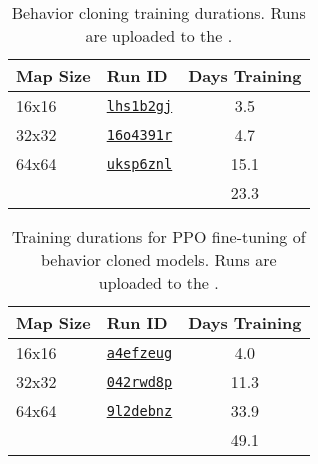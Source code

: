 \documentclass[conference]{IEEEtran}
\newcounter{supptable}
\newenvironment{supptable}
  {\renewcommand{\tablename}{Supplemental Table}\setcounter{table}{\value{supptable}}\addtocounter{supptable}{1}\begin{table}}
  {\end{table}\setcounter{supptable}{\value{table}}}
\begin{document}
\begin{supptable}[H]
    \caption{Behavior cloning training durations. Runs are uploaded to the \microRTSWBProject.}
    \label{tab:bc-training-durations}
    \begin{center}
    \begin{tabular}{llc}
        Map Size & Run ID & Days Training \\
        \midrule
        16x16 & \href{https://wandb.ai/\microRTSWBProjectPath/runs/lhs1b2gj}{\texttt{lhs1b2gj}} & 3.5 \\
        32x32 & \href{https://wandb.ai/\microRTSWBProjectPath/runs/16o4391r}{\texttt{16o4391r}} & 4.7 \\
        64x64 & \href{https://wandb.ai/\microRTSWBProjectPath/runs/uksp6znl}{\texttt{uksp6znl}} & 15.1 \\
        \hline
        \multicolumn{1}{l}{} & \multicolumn{1}{l}{} & 23.3
    \end{tabular}
    \end{center}
\end{supptable}

\begin{supptable}[H]
    \caption{Training durations for PPO fine-tuning of behavior cloned models. Runs are uploaded to the \microRTSWBProject.}
    \label{tab:bc-ppo-training-durations}
    \begin{center}
    \begin{tabular}{llc}
        Map Size & Run ID & Days Training \\
        \midrule
        16x16 & \href{https://wandb.ai/\microRTSWBProjectPath/runs/a4efzeug}{\texttt{a4efzeug}} & 4.0 \\
        32x32 & \href{https://wandb.ai/\microRTSWBProjectPath/runs/042rwd8p}{\texttt{042rwd8p}} & 11.3 \\
        64x64 & \href{https://wandb.ai/\microRTSWBProjectPath/runs/9l2debnz}{\texttt{9l2debnz}} & 33.9 \\
        \hline
        \multicolumn{1}{l}{} & \multicolumn{1}{l}{} & 49.1
    \end{tabular}
    \end{center}
\end{supptable}
\end{document}
